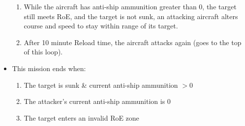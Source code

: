 \documentclass{article}
\begin{document}
\begin{itemize}
                    \begin{enumerate}
                        \item While the aircraft has anti-ship ammunition greater than 0, the target still meets RoE, and the target is not sunk, an attacking aircraft alters course and speed to stay within range of its target.
                        \item After 10 minute Reload time, the aircraft attacks again (goes to the top of this loop).
                    \end{enumerate}
                \item{This mission ends when:} 
                \begin{enumerate}[label=\arabic*)]
                    \item The target is sunk \& current anti-ship ammunition $>0$ \par
                    [aircraft transits to holding area then resumes holding, report Chinese ship sinking]
                    \item The attacker’s current anti-ship ammunition is $0$ \par
                    [aircraft transits to base, report damage to Chinese ship]
                    \item The target enters an invalid RoE zone \par
                    [aircraft transits to holding area then resumes holding]
                \end{enumerate}
            \end{itemize}
\end{document}
